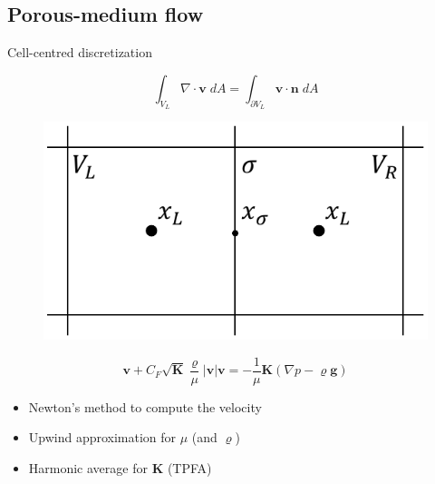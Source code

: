 \documentclass{beamer}
\begin{document}
\subsection*{Porous-medium flow}
\begin{frame}{Cell-centred discretization}
\begin{minipage}[t]{0.49\textwidth}
	\vspace{0.5cm}
\begin{equation*}
\int_{V_L} \nabla \cdot \mathbf{v} \; dA = \int_{\partial V_L} \mathbf{v} 
\cdot \mathbf{n} \; dA
\end{equation*}
\end{minipage}
\begin{minipage}[t]{0.49\textwidth}
\begin{figure}
	\centering
	\includegraphics[height=0.3\textheight]{cctpfa.pdf}
\end{figure}
\end{minipage}
\begin{equation*}
	\mathbf{v} + C_F \sqrt{\mathbf{K}} \frac{\varrho}{\mu} |\mathbf{v}| 
	\mathbf{v} = - \frac{1}{\mu}\mathbf{K} (\nabla p - \varrho \mathbf{g})
\end{equation*}
\begin{itemize}
	\item Newton's method to compute the velocity
	\item Upwind approximation for $\mu$ (and $\varrho$)
	\item Harmonic average for $\mathbf{K}$ (TPFA)
\end{itemize}

\end{frame}
\end{document}
